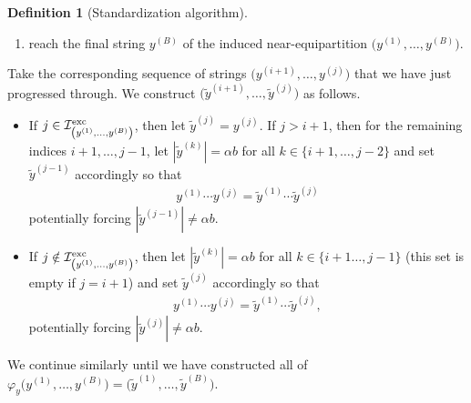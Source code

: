 \documentclass[11pt]{amsart}
\numberwithin{equation}{section}
\numberwithin{equation}{section}
\newcommand{\1}{\mathbbm{1}}
\newcommand{\exc}{\textup{exc}}
\theoremstyle{definition}
\newtheorem{definition}[theorem]{Definition}
\begin{document}
\begin{definition}[Standardization algorithm]
\begin{enumerate}
        \item[(c)] reach the final string $y^{(B)}$ of the induced near-equipartition $\big(y^{(1)}, \dots, y^{(B)}\big)$.
    \end{enumerate}
    Take the corresponding sequence of strings $\big(y^{(i+1)}, \dots, y^{(j)}\big)$ that we have just progressed through. We construct $\big(\tilde{y}^{(i+1)}, \dots, \tilde{y}^{(j)}\big)$ as follows.
    \begin{itemize}
        \item If $j \in \mathcal I_{\left(y^{(1)}, \dots, y^{(B)}\right)}^\exc$, then let $\tilde{y}^{(j)} = y^{(j)}$. If $j > i+1$, then for the remaining indices $i+1, \dots, j-1$, let $|\tilde{y}^{(k)}| = \alpha b$ for all $k \in \{ i+1, \dots, j-2 \}$ and set $\tilde{y}^{(j-1)}$ accordingly so that
        \begin{align} \label{eq:standarziation_algo_key_cond_j}
            y^{(1)} \cdots y^{(j)} = \tilde{y}^{(1)} \cdots \tilde{y}^{(j)}
        \end{align}
        potentially forcing $|\tilde{y}^{(j-1)}| \neq \alpha b$.

        \item If $j \notin \mathcal I_{\left(y^{(1)}, \dots, y^{(B)}\right)}^\exc$, then let $|\tilde{y}^{(k)}| = \alpha b$ for all $k \in \{ i+1 \dots, j-1 \}$ (this set is empty if $j = i+1$) and set $\tilde{y}^{(j)}$ accordingly so that
        \begin{align*}
            y^{(1)} \cdots y^{(j)} = \tilde{y}^{(1)} \cdots \tilde{y}^{(j)},
        \end{align*}
        potentially forcing $|\tilde{y}^{(j)}| \neq \alpha b$.
    \end{itemize}
    We continue similarly until we have constructed all of $\varphi_{y}\big(y^{(1)}, \dots, y^{(B)}\big) = \big(\tilde{y}^{(1)}, \dots, \tilde{y}^{(B)}\big)$.
\end{definition}
\end{document}
